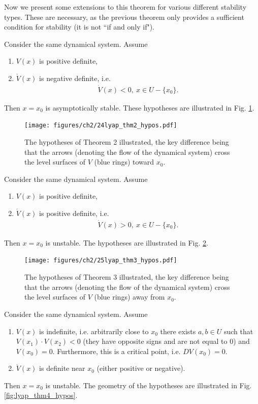 Now we present some extensions to this theorem for various different stability types. These are necessary, as the previous theorem only provides a sufficient condition for stability (it is not ``if and only if").

\begin{theorem}[Theorem 2]
Consider the same dynamical system. Assume
\begin{enumerate}
	\item $V(x)$ is positive definite,
	\item $\dot{V}(x)$ is negative definite, i.e.
		\begin{align}
			\dot{V}(x) < 0,\ x\in U- \{x_0\}.
		\end{align}
\end{enumerate}
		Then $x=x_0$ is asymptotically stable. These hypotheses are illustrated in Fig. \ref{fig:lyap_thm2_hypos}.
\end{theorem}
\begin{figure}[h!]
	\centering
	\texttt{[image: figures/ch2/24lyap\_thm2\_hypos.pdf]}
	\caption{The hypotheses of Theorem 2 illustrated, the key difference being that the arrows (denoting the flow of the dynamical system) cross the level surfaces of $V$ (blue rings) toward $x_0$.}
	\label{fig:lyap_thm2_hypos}
\end{figure}

\begin{theorem}[Theorem 3]
	Consider the same dynamical system. Assume
	\begin{enumerate}
		\item $V(x)$ is positive definite,
		\item $\dot{V}(x)$ is positive definite, i.e.
		\begin{align}
			\dot{V}(x)>0,\ x\in U- \{x_0\}.
		\end{align}
	\end{enumerate}
	Then $x=x_0$ is unstable. The hypotheses are illustrated in Fig. \ref{fig:lyap_thm3_hypos}.
\end{theorem}

\begin{figure}[h!]
	\centering
	\texttt{[image: figures/ch2/25lyap\_thm3\_hypos.pdf]}
	\caption{The hypotheses of Theorem 3 illustrated, the key difference being that the arrows (denoting the flow of the dynamical system) cross the level surfaces of $V$ (blue rings) away from $x_0$.}
	\label{fig:lyap_thm3_hypos}
\end{figure}

\begin{theorem}[Theorem 4]
	Consider the same dynamical system. Assume
	\begin{enumerate}
		\item $V(x)$ is indefinite, i.e. arbitrarily close to $x_0$ there exists $a,b \in U$ such that $V(x_1)\cdot V(x_2) <0$ (they have opposite signs and are not equal to 0) and $V(x_0)=0$. Furthermore, this is a critical point, i.e. $DV(x_0)=0$.
		\item $\dot{V}(x)$ is definite near $x_0$ (either positive or negative).
	\end{enumerate}
	Then $x=x_0$ is unstable. The geometry of the hypotheses are  illustrated in Fig. \ref{fig:lyap_thm4_hypos}.
\end{theorem}

